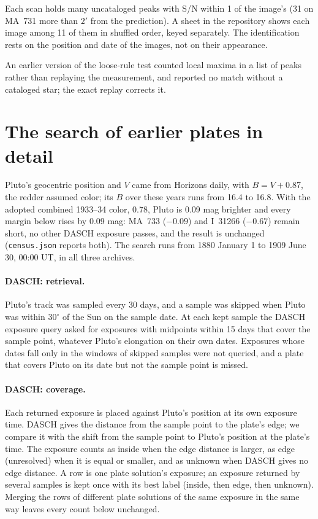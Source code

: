 \documentclass[11pt]{article}
\begin{document}
\begin{appendices}
Each scan holds many uncataloged peaks with S/N within 1 of the image's (31 on MA~731 more than $2'$ from the prediction). A sheet in the repository shows each image among 11 of them in shuffled order, keyed separately. The identification rests on the position and date of the images, not on their appearance.

An earlier version of the loose-rule test counted local maxima in a list of peaks rather than replaying the measurement, and reported no match without a cataloged star; the exact replay corrects it.

\section{The search of earlier plates in detail}
\label{app:census}

Pluto's geocentric position and $V$ came from Horizons daily, with $B=V+0.87$, the redder assumed color; its $B$ over these years runs from 16.4 to 16.8. With the adopted combined 1933--34 color, 0.78, Pluto is 0.09 mag brighter and every margin below rises by 0.09 mag: MA~733 ($-0.09$) and I~31266 ($-0.67$) remain short, no other DASCH exposure passes, and the result is unchanged (\texttt{census.json} reports both). The search runs from 1880 January 1 to 1909 June 30, 00:00 UT, in all three archives.

\paragraph{DASCH: retrieval.} Pluto's track was sampled every 30 days, and a sample was skipped when Pluto was within $30^\circ$ of the Sun on the sample date. At each kept sample the DASCH exposure query asked for exposures with midpoints within 15 days that cover the sample point, whatever Pluto's elongation on their own dates. Exposures whose dates fall only in the windows of skipped samples were not queried, and a plate that covers Pluto on its date but not the sample point is missed.

\paragraph{DASCH: coverage.} Each returned exposure is placed against Pluto's position at its own exposure time. DASCH gives the distance from the sample point to the plate's edge; we compare it with the shift from the sample point to Pluto's position at the plate's time. The exposure counts as inside when the edge distance is larger, as edge (unresolved) when it is equal or smaller, and as unknown when DASCH gives no edge distance. A row is one plate solution's exposure; an exposure returned by several samples is kept once with its best label (inside, then edge, then unknown). Merging the rows of different plate solutions of the same exposure in the same way leaves every count below unchanged.


\end{appendices}
\end{document}
